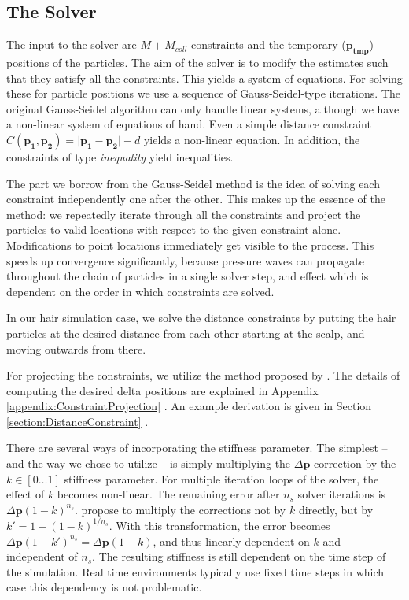 \documentclass[sigplan,screen,nonacm]{acmart}
\renewcommand{\b}{\boldsymbol}
\begin{document}
\subsection{The Solver}
\label{sec:solver}
The input to the solver are $M + M_{coll}$ constraints and the temporary
($\b{p_{tmp}}$) positions of the particles. The aim of the solver is to modify
the estimates such that they satisfy all the constraints. This yields a system
of equations. For solving these for particle positions we use
a sequence of Gauss-Seidel-type iterations. The original Gauss-Seidel algorithm
can only handle linear systems, although we have a non-linear system of
equations of hand. Even a simple distance constraint $ C(\b{p_1}, \b{p_2})
= \lvert \b{p_1} - \b{p_2} \rvert - d $ yields a non-linear equation. In
addition, the constraints of type \emph{inequality} yield inequalities.

The part we borrow from the Gauss-Seidel method is the idea of solving each
constraint independently one after the other. This makes up the essence of the
method: we repeatedly iterate through all the constraints and project the
particles to valid locations with respect to the given constraint alone.
Modifications to point locations immediately get visible to the process. This
speeds up convergence significantly, because pressure waves can propagate
throughout the chain of particles in a single solver step, and effect which is
dependent on the order in which constraints are solved. 

In our hair simulation case, we solve the distance constraints by putting the
hair particles at the desired distance from each other starting at the scalp,
and moving outwards from there.

For projecting the constraints, we utilize the method proposed by
\citet{MullerPBD}. The details of computing the desired delta positions are
explained in Appendix \ref{appendix:ConstraintProjection}
. An example derivation is given in
Section \ref{section:DistanceConstraint} .

There are several ways of incorporating the stiffness parameter. The simplest
-- and the way we chose to utilize -- is simply multiplying the $\Delta \b{p}$
correction by the $k \in [0 \ldots 1]$ stiffness parameter. For multiple
iteration loops of the solver, the effect of $k$ becomes non-linear. The
remaining error after $n_s$ solver iterations is $\Delta \b{p}(1-k)^{n_s}$.
\citet{MullerPBD} propose to multiply the corrections not by $k$ directly, but
by $k' = 1 - (1-k)^{1/n_s}$. With this transformation, the error becomes $\Delta
\b{p}(1-k')^{n_s} = \Delta\b{p}(1-k)$, and thus linearly dependent on $k$ and
independent of $n_s$. The resulting stiffness is still dependent on the time
step of the simulation. Real time environments typically use fixed time steps in
which case this dependency is not problematic.
\end{document}
